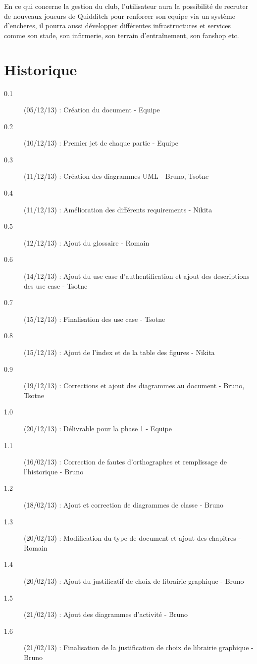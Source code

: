 \documentclass[a4paper]{report}
\begin{document}
En ce qui concerne la gestion du \gls{club}, l'\gls{utilisateur} aura la possibilité de recruter de nouveaux \glspl{joueur} de Quidditch pour renforcer son \gls{equipe} via un système d'\glspl{enchere}, il pourra aussi développer différentes infrastructures et services comme son stade, son infirmerie, son terrain d'entraînement, son fanshop etc.


\printglossary[numberedsection]
\section{Historique}
\begin{description}
    \item[0.1] (05/12/13) : Création du document - Equipe
    \item[0.2] (10/12/13) : Premier jet de chaque partie - Equipe
    \item[0.3] (11/12/13) : Création des diagrammes UML - Bruno, Tsotne
    \item[0.4] (11/12/13) : Amélioration des différents requirements - Nikita
    \item[0.5] (12/12/13) : Ajout du glossaire - Romain
    \item[0.6] (14/12/13) : Ajout du use case d'authentification et ajout des descriptions des use case - Tsotne
    \item[0.7] (15/12/13) : Finalisation des use case - Tsotne
    \item[0.8] (15/12/13) : Ajout de l'index et de la table des figures - Nikita
    \item[0.9] (19/12/13) : Corrections et ajout des diagrammes au document - Bruno, Tsotne
    \item[1.0] (20/12/13) : Délivrable pour la phase 1 - Equipe
    \item[1.1] (16/02/13) : Correction de fautes d'orthographes et remplissage de l'historique - Bruno
    \item[1.2] (18/02/13) : Ajout et correction de diagrammes de classe - Bruno
    \item[1.3] (20/02/13) : Modification du type de document et ajout des chapitres - Romain
    \item[1.4] (20/02/13) : Ajout du justificatif de choix de librairie graphique - Bruno
    \item[1.5] (21/02/13) : Ajout des diagrammes d'activité - Bruno
    \item[1.6] (21/02/13) : Finalisation de la justification de choix de librairie graphique - Bruno
\end{description}
\end{document}
